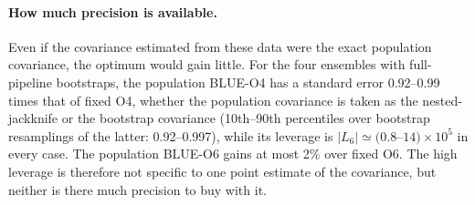 \documentclass[aps,prd,reprint,twocolumn,superscriptaddress,nofootinbib,longbibliography]{revtex4-2}
\begin{document}
\begin{table}[t]
\caption{Synthetic ensembles ($n=992$) with known covariance and response. For each truth, the first column is the mean displacement from the true $y_0$ in units of the estimator's standard deviation over the mocks (Monte Carlo error about 0.03), the second the root-mean-square error relative to fixed O6. ``Data'' uses the measured cubic coefficient; ``$3\times$'' triples it.}
\label{tab:synthetic}
\centering
\setlength{\tabcolsep}{3pt}
\end{table}

\paragraph{How much precision is available.} Even if the covariance estimated from these data were the exact population covariance, the optimum would gain little. For the four ensembles with full-pipeline bootstraps, the population BLUE-O4 has a standard error 0.92--0.99 times that of fixed O4, whether the population covariance is taken as the nested-jackknife or the bootstrap covariance (10th--90th percentiles over bootstrap resamplings of the latter: 0.92--0.997), while its leverage is $|L_6|\simeq(0.8$--$14)\times10^5$ in every case. The population BLUE-O6 gains at most 2\% over fixed O6. The high leverage is therefore not specific to one point estimate of the covariance, but neither is there much precision to buy with it.
\end{document}
